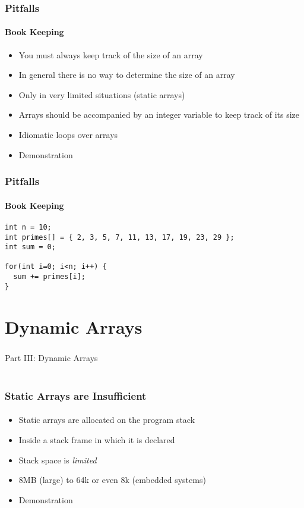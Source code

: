 \documentclass[]{beamer}
\begin{document}
\begin{frame}[fragile]
    \frametitle{Pitfalls}
    \framesubtitle{Book Keeping}

\begin{itemize}[<+->]  
  \item You must always keep track of the size of an array
  \item In general there is no way to determine the size of an array
  \item Only in very limited situations (static arrays)
  \item Arrays should be accompanied by an integer variable to keep 
  track of its size
  \item Idiomatic loops over arrays
  \item Demonstration
\end{itemize}
\end{frame}

\begin{frame}[fragile]
    \frametitle{Pitfalls}
    \framesubtitle{Book Keeping}
    
\begin{verbatim}
int n = 10;
int primes[] = { 2, 3, 5, 7, 11, 13, 17, 19, 23, 29 };
int sum = 0;

for(int i=0; i<n; i++) {
  sum += primes[i];
}
\end{verbatim}

\end{frame}

\section{Dynamic Arrays}

\begin{frame}
    \frametitle{}
    \framesubtitle{}
    
    \begin{center}
    {\Huge Part III: Dynamic Arrays}\\
    {\Large ~}
    \end{center}

\end{frame}

\begin{frame}[fragile]
    \frametitle{Static Arrays are Insufficient}
    \framesubtitle{}

\begin{itemize}[<+->]  
  \item Static arrays are allocated on the program stack
  \item Inside a stack frame in which it is declared
  \item Stack space is \emph{limited} 
  \item 8MB (large) to 64k or even 8k (embedded systems)
  \item Demonstration  
\end{itemize}

\end{frame}
\end{document}
